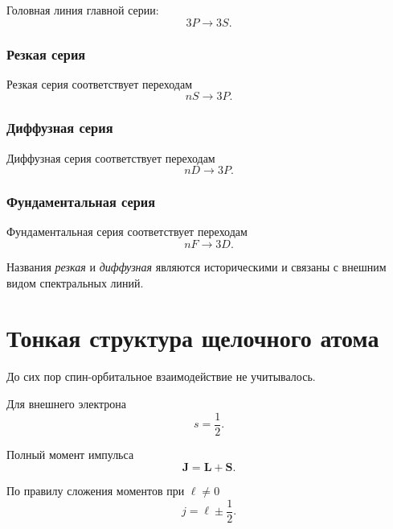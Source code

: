 \documentclass[../final.tex]{subfiles}
\begin{document}
Головная линия главной серии:
\begin{equation*}
    3P\rightarrow3S.
\end{equation*}

\subsubsection{Резкая серия}

Резкая серия соответствует переходам
\begin{equation*}
    nS\rightarrow3P.
\end{equation*}

\subsubsection{Диффузная серия}

Диффузная серия соответствует переходам
\begin{equation*}
    nD\rightarrow3P.
\end{equation*}

\subsubsection{Фундаментальная серия}

Фундаментальная серия соответствует переходам
\begin{equation*}
    nF\rightarrow3D.
\end{equation*}

Названия \emph{резкая} и \emph{диффузная} являются историческими
и связаны с внешним видом спектральных линий.

\section{Тонкая структура щелочного атома}

До сих пор спин-орбитальное взаимодействие не учитывалось.

Для внешнего электрона
\begin{equation*}
    s=\frac12.
\end{equation*}

Полный момент импульса
\begin{equation*}
    \mathbf J
    =
    \mathbf L+\mathbf S.
\end{equation*}

По правилу сложения моментов при \(\ell\neq0\)
\begin{equation*}
    \boxed{
        j
        =
        \ell\pm\frac12
    }.
\end{equation*}
\end{document}
